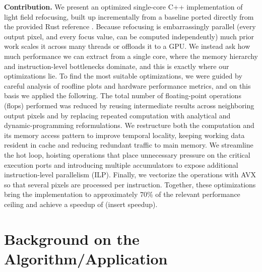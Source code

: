 \documentclass[letterpaper]{article}
\newcommand{\mypar}[1]{{\bf #1.}}
\begin{document}

\mypar{Contribution}
We present an optimized single-core C++ implementation of light field refocusing, built up incrementally from a baseline ported directly from the provided Rust reference \cite{rust_implement}. Because refocusing is embarrassingly parallel (every output pixel, and every focus value, can be computed independently) much prior work scales it across many threads or offloads it to a GPU. We instead ask how much performance we can extract from a single core, where the memory hierarchy and instruction-level bottlenecks dominate, and this is exactly where our optimizations lie. To find the most suitable optimizations, we were guided by careful analysis of roofline plots and hardware performance metrics, and on this basis we applied the following. The total number of floating-point operations (flops) performed was reduced by reusing intermediate results across neighboring output pixels and by replacing repeated computation with analytical and dynamic-programming reformulations. We restructure both the computation and its memory access pattern to improve temporal locality, keeping working data
resident in cache and reducing redundant traffic to main memory. We streamline the hot loop, hoisting operations that place unnecessary pressure on the critical execution ports and introducing multiple
accumulators to expose additional instruction-level parallelism (ILP). Finally, we vectorize the operations with AVX so that several pixels are processed per instruction. Together, these optimizations bring the implementation to approximately 70\% of the relevant performance ceiling and achieve a speedup of (insert speedup). \todo


\section{Background on the Algorithm/Application}\label{sec:background}
\end{document}
